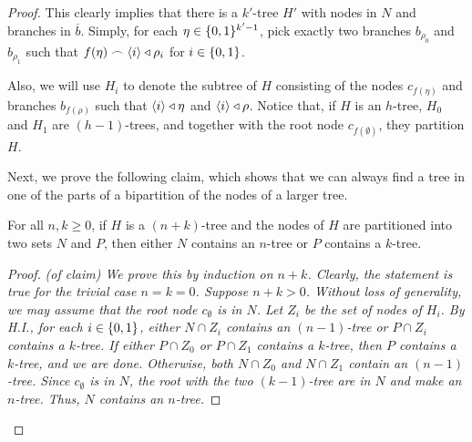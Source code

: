 \begin{theorem}
\begin{proof}
            This clearly implies that there is a $k'$-tree $H'$ with nodes in $N$ and branches in $\overline{b}$.
            Simply, for each $\eta \in \{ 0,1 \}^{k'-1}$, pick exactly two branches $b_{\rho_0}$ and $b_{\rho_1}$ such that
            $f(\eta)\frown\left< i \right> \triangleleft \rho_i$ for $i \in \{ 0,1 \}$.

            Also, we will use $H_i$ to denote the subtree of $H$ consisting of the nodes $c_{f(\eta)}$ and branches
            $b_{f(\rho)}$ such that $\left< i \right> \triangleleft \eta$ and $\left< i \right> \triangleleft \rho$.
            Notice that, if $H$ is an $h$-tree, $H_0$ and $H_1$ are $(h-1)$-trees, and together with the root node
            $c_{f(\emptyset)}$, they partition $H$.

            Next, we prove the following claim, which shows that we can always find a tree
            in one of the parts of a bipartition of the nodes of a larger tree.

            \begin{claim}
                For all $n, k \geq 0$, if $H$ is a $(n + k)$-tree and the nodes of $H$ are partitioned into two sets $N$ and $P$,
                then either $N$ contains an $n$-tree or $P$ contains a $k$-tree.
                \begin{proof} \it{(of claim)}
                    We prove this by induction on $n + k$.
                    Clearly, the statement is true for the trivial case $n = k = 0$.
                    Suppose $n + k > 0$.
                    Without loss of generality, we may assume that the root node $c_\emptyset$ is in $N$.
                    Let $Z_i$ be the set of nodes of $H_i$.
                    By H.I., for each $i \in \{ 0,1 \}$, either $N \cap Z_i$ contains an $(n-1)$-tree or
                    $P \cap Z_i$ contains a $k$-tree.
                    If either $P \cap Z_0$ or $P \cap Z_1$ contains a $k$-tree, then $P$ contains a $k$-tree, and we are done.
                    Otherwise, both $N \cap Z_0$ and $N \cap Z_1$ contain an $(n-1)$-tree.
                    Since $c_\emptyset$ is in $N$, the root with the two $(k-1)$-tree are in $N$ and make an $n$-tree.
                    Thus, $N$ contains an $n$-tree.
                \end{proof}
            \end{claim}


\end{proof}
\end{theorem}
